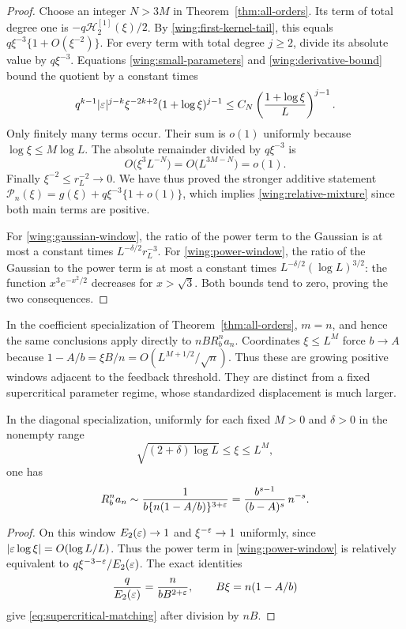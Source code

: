 \begin{proof}
Choose an integer $N>3M$ in Theorem~\ref{thm:all-orders}.
Its term of total degree one is
$-q\mathcal H_2^{[1]}(\xi)/2$.  By
\eqref{wing:first-kernel-tail}, this equals
$q\xi^{-3}\{1+O(\xi^{-2})\}$.
For every term with total degree $j\ge2$, divide its absolute
value by $q\xi^{-3}$.  Equations
\eqref{wing:small-parameters} and \eqref{wing:derivative-bound}
bound the quotient by a constant times
\[
 q^{k-1}|\varepsilon|^{j-k}
       \xi^{-2k+2}(1+\log\xi)^{j-1}
 \le C_N\left(\frac{1+\log\xi}{L}\right)^{j-1}.
\]
Only finitely many terms occur.  Their sum is $o(1)$ uniformly
because $\log\xi\le M\log L$.
The absolute remainder divided by $q\xi^{-3}$ is
\[
 O\bigl(\xi^3L^{-N}\bigr)=O\bigl(L^{3M-N}\bigr)=o(1).
\]
Finally $\xi^{-2}\le r_L^{-2}\to0$.
We have thus proved the stronger additive statement
$\mathcal P_n(\xi)=g(\xi)+q\xi^{-3}\{1+o(1)\}$,
which implies \eqref{wing:relative-mixture} since both main terms
are positive.

For \eqref{wing:gaussian-window}, the ratio of the power term to
the Gaussian is at most a constant times
$L^{-\delta/2}r_L^{-3}$.  For \eqref{wing:power-window}, the
ratio of the Gaussian to the power term is at most a constant
times $L^{-\delta/2}(\log L)^{3/2}$: the function
$x^3e^{-x^2/2}$ decreases for $x>\sqrt3$.
Both bounds tend to zero, proving the two consequences.
\end{proof}

In the coefficient specialization of Theorem~\ref{thm:all-orders},
$m=n$, and hence the same conclusions apply directly to
$nBR_b^n a_n$.  Coordinates $\xi\le L^M$ force $b\to A$
because $1-A/b=\xi B/n=O(L^{M+1/2}/\sqrt n)$.
Thus these are growing positive windows adjacent to the feedback
threshold.  They are distinct from a fixed supercritical parameter
regime, whose standardized displacement is much larger.

\begin{corollary}
\label{cor:supercritical-matching}
In the diagonal specialization, uniformly for each fixed $M>0$ and
$\delta>0$ in the nonempty range
\[
 \sqrt{(2+\delta)\log L}\le\xi\le L^M,
\]
one has
\begin{equation}\label{eq:supercritical-matching}
 R_b^n a_n\sim
 \frac1{b\{n(1-A/b)\}^{3+\varepsilon}}
 =\frac{b^{s-1}}{(b-A)^s}\,n^{-s}.
\end{equation}
\end{corollary}
\begin{proof}
On this window $E_2(\varepsilon)\to1$ and
$\xi^{-\varepsilon}\to1$ uniformly, since
$|\varepsilon\log\xi|=O(\log L/L)$. Thus the power term in
\eqref{wing:power-window} is relatively equivalent to
$q\xi^{-3-\varepsilon}/E_2(\varepsilon)$. The exact identities
\[
 \frac{q}{E_2(\varepsilon)}=\frac{n}{bB^{2+\varepsilon}},\qquad
 B\xi=n(1-A/b)
\]
give \eqref{eq:supercritical-matching} after division by $nB$.
\end{proof}

